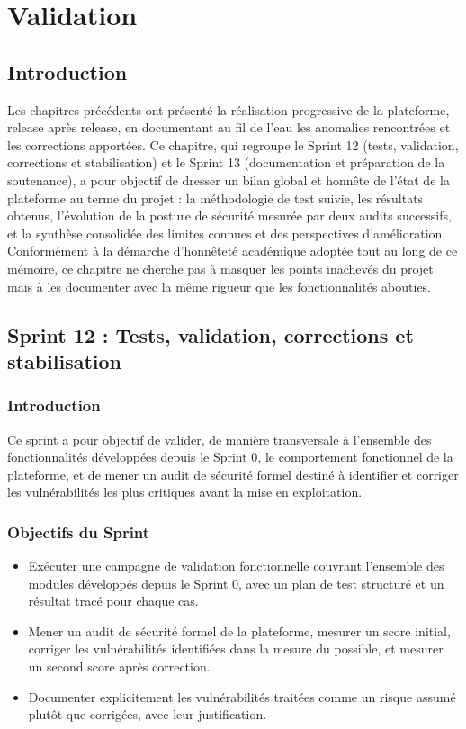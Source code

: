 \chapter{Validation}

\section{Introduction}

Les chapitres précédents ont présenté la réalisation progressive de la plateforme, release après release, en documentant au fil de l'eau les anomalies rencontrées et les corrections apportées. Ce chapitre, qui regroupe le Sprint 12 (tests, validation, corrections et stabilisation) et le Sprint 13 (documentation et préparation de la soutenance), a pour objectif de dresser un bilan global et honnête de l'état de la plateforme au terme du projet : la méthodologie de test suivie, les résultats obtenus, l'évolution de la posture de sécurité mesurée par deux audits successifs, et la synthèse consolidée des limites connues et des perspectives d'amélioration. Conformément à la démarche d'honnêteté académique adoptée tout au long de ce mémoire, ce chapitre ne cherche pas à masquer les points inachevés du projet mais à les documenter avec la même rigueur que les fonctionnalités abouties.

\clearpage
\section{Sprint 12 : Tests, validation, corrections et stabilisation}

\subsection{Introduction}

Ce sprint a pour objectif de valider, de manière transversale à l'ensemble des fonctionnalités développées depuis le Sprint 0, le comportement fonctionnel de la plateforme, et de mener un audit de sécurité formel destiné à identifier et corriger les vulnérabilités les plus critiques avant la mise en exploitation.

\subsection{Objectifs du Sprint}

\begin{itemize}
    \item Exécuter une campagne de validation fonctionnelle couvrant l'ensemble des modules développés depuis le Sprint 0, avec un plan de test structuré et un résultat tracé pour chaque cas.
    \item Mener un audit de sécurité formel de la plateforme, mesurer un score initial, corriger les vulnérabilités identifiées dans la mesure du possible, et mesurer un second score après correction.
    \item Documenter explicitement les vulnérabilités traitées comme un risque assumé plutôt que corrigées, avec leur justification.
\end{itemize}

